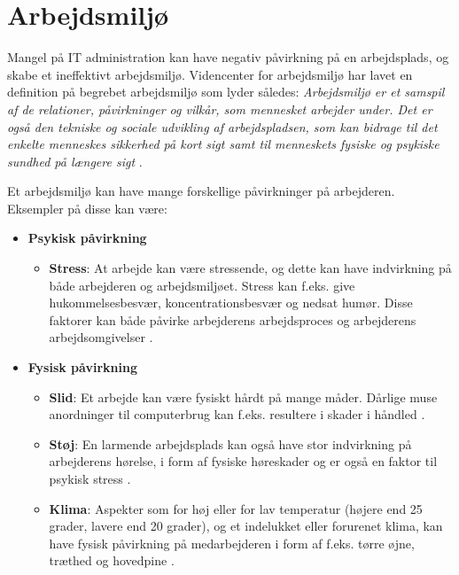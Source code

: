 \section{Arbejdsmiljø}
\noindent Mangel på IT administration kan have negativ påvirkning på en arbejdsplads, og skabe et ineffektivt arbejdsmiljø. Videncenter for arbejdsmiljø har lavet en definition på begrebet arbejdsmiljø som lyder således: \textit{Arbejdsmiljø er et samspil af de relationer, påvirkninger og vilkår, som mennesket arbejder under. Det er også den tekniske og sociale udvikling af arbejdspladsen, som kan bidrage til det enkelte menneskes sikkerhed på kort sigt samt til menneskets fysiske og psykiske sundhed på længere sigt} \citep{Arbejdsmiljoe}.

Et arbejdsmiljø kan have mange forskellige påvirkninger på arbejderen. Eksempler på disse kan være: 
\begin{itemize}
    \item {\textbf{Psykisk påvirkning} \citep{Arbejdsmiljoe_psykisk}}
    \begin{itemize}
    \item {\textbf{Stress}: At arbejde kan være stressende, og dette kan have indvirkning på både arbejderen og arbejdsmiljøet. Stress kan f.eks. give hukommelsesbesvær, koncentrationsbesvær og nedsat humør. Disse faktorer kan både påvirke arbejderens arbejdsproces og arbejderens arbejdsomgivelser \citep{Arbejdsmiljoe_stress}.}
    \end{itemize}
    \item {\textbf{Fysisk påvirkning} \citep{Arbejdsmiljoe_fysisk}}
    \begin{itemize}
    \item {\textbf{Slid}: Et arbejde kan være fysiskt hårdt på mange måder. Dårlige muse anordninger til computerbrug kan f.eks. resultere i skader i håndled \citep{Arbejdsmiljoe_fysisk}.}
    \item {\textbf{Støj}: En larmende arbejdsplads kan også have stor indvirkning på arbejderens hørelse, i form af fysiske høreskader og er også en faktor til psykisk stress \citep{Arbejdsmiljoe_stoej}.}
    \item {\textbf{Klima}: Aspekter som for høj eller for lav temperatur (højere end 25 grader, lavere end 20 grader), og et indelukket eller forurenet klima, kan have fysisk påvirkning på medarbejderen i form af f.eks. tørre øjne, træthed og hovedpine \citep{Arbejdsmiljoe_indeklima}.}\\
    \end{itemize}
\end{itemize}

